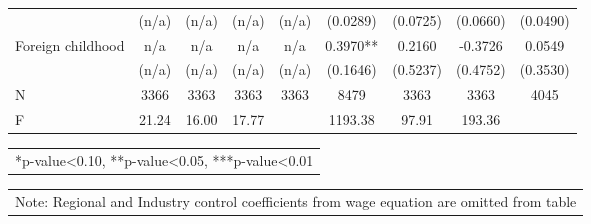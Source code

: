 \documentclass[12pt]{report}
\begin{document}
\begin{sidewaystable}
\begin{tabular}{lc|c|c|c|c|c|c|c}
& (n/a) & (n/a) & (n/a) & (n/a) & (0.0289) & (0.0725) & (0.0660) & (0.0490)\\
Foreign childhood & n/a & n/a & n/a & n/a & 0.3970** & 0.2160 & -0.3726 & 0.0549\\
& (n/a) & (n/a) & (n/a) & (n/a) & (0.1646) & (0.5237) & (0.4752) & (0.3530)\\
\hline
N & 3366 & 3363 & 3363 & 3363 & 8479 & 3363 & 3363 & 4045\\
F & 21.24 & 16.00 & 17.77 & & 1193.38 & 97.91 & 193.36 & \\
\hline
\hline
\end{tabular}
\begin{tabular}{p{6.25in}}\footnotesize{
*p-value<0.10, **p-value<0.05, ***p-value<0.01}\\
\end{tabular}
\begin{tabular}{p{6.25in}}\footnotesize{
Note: Regional and Industry control coefficients from wage equation are omitted from table}\\
\end{tabular}
\end{sidewaystable}

\begin{comment}R-sq & 0.1621 & -0.2226 & -0.5593 & -0.6958 & 0.6474 & -0.1074 & -0.3576 & -0.0373\\
\end{comment}
\end{document}
